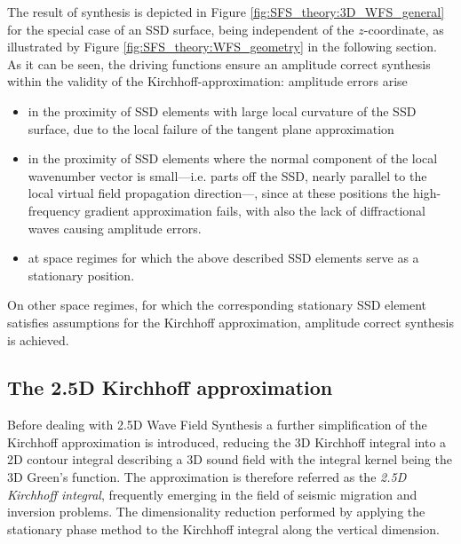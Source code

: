 The result of synthesis is depicted in Figure \ref{fig:SFS_theory:3D_WFS_general} for the special case of an SSD surface, being independent of the $z$-coordinate, as illustrated by Figure \ref{fig:SFS_theory:WFS_geometry} in the following section.
As it can be seen, the driving functions ensure an amplitude correct synthesis within the validity of the Kirchhoff-approximation:
amplitude errors arise 
\begin{itemize}
\item in the proximity of SSD elements with large local curvature of the SSD surface, due to the local failure of the tangent plane approximation
\item in the proximity of SSD elements where the normal component of the local wavenumber vector is small---i.e. parts off the SSD, nearly parallel to the local virtual field propagation direction---, since at these positions the high-frequency gradient approximation fails, with also the lack of diffractional waves causing amplitude errors.
\item at space regimes for which the above described SSD elements serve as a stationary position.
\end{itemize}
On other space regimes, for which the corresponding stationary SSD element satisfies assumptions for the Kirchhoff approximation, amplitude correct synthesis is achieved.

\subsection{The 2.5D Kirchhoff approximation}

Before dealing with 2.5D Wave Field Synthesis a further simplification of the Kirchhoff approximation is introduced, reducing the 3D Kirchhoff integral into a 2D contour integral describing a 3D sound field with the integral kernel being the 3D Green's function.
The approximation is therefore referred as the \emph{2.5D Kirchhoff integral}, frequently emerging in the field of seismic migration and inversion problems.
The dimensionality reduction performed by applying the stationary phase method to the Kirchhoff integral along the vertical dimension.

